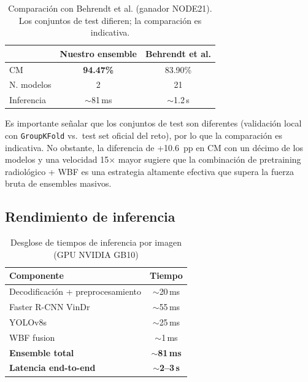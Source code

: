 \documentclass[conference]{IEEEtran}
\begin{document}
\begin{table}[t]
\caption{Comparaci\'{o}n con Behrendt et al. (ganador NODE21). Los conjuntos
de test difieren; la comparaci\'{o}n es indicativa.}
\label{tab:comparacion}
\centering
\footnotesize
\begin{tabular}{lcc}
\toprule
 & \textbf{Nuestro ensemble} & \textbf{Behrendt et al.} \\
\midrule
CM              & \textbf{94.47\%} & 83.90\%       \\
N.\textordmasculine{} modelos & 2                & 21            \\
Inferencia      & $\sim$81\,ms     & $\sim$1.2\,s  \\
\bottomrule
\end{tabular}
\end{table}

Es importante se\~{n}alar que los conjuntos de test son diferentes
(validaci\'{o}n local con \texttt{GroupKFold} vs.\ test set oficial del reto),
por lo que la comparaci\'{o}n es indicativa. No obstante, la diferencia de
+10.6~pp en CM con un d\'{e}cimo de los modelos y una velocidad 15$\times$
mayor sugiere que la combinaci\'{o}n de pretraining radiol\'{o}gico + WBF es
una estrategia altamente efectiva que supera la fuerza bruta de ensembles
masivos.


\subsection{Rendimiento de inferencia}

\begin{table}[t]
\caption{Desglose de tiempos de inferencia por imagen (GPU NVIDIA GB10)}
\label{tab:rendimiento}
\centering
\footnotesize
\begin{tabular}{lc}
\toprule
\textbf{Componente} & \textbf{Tiempo} \\
\midrule
Decodificaci\'{o}n + preprocesamiento & $\sim$20\,ms \\
Faster R-CNN VinDr                    & $\sim$55\,ms \\
YOLOv8s                               & $\sim$25\,ms \\
WBF fusion                            & $\sim$1\,ms  \\
\midrule
\textbf{Ensemble total}               & $\sim$\textbf{81\,ms} \\
\textbf{Latencia end-to-end}          & $\sim$\textbf{2--3\,s} \\
\bottomrule
\end{tabular}
\end{table}
\end{document}
